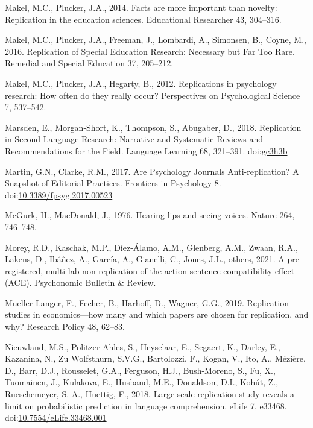 \documentclass[]{elsarticle} %
\newlength{\cslhangindent}
\newlength{\cslentryspacingunit} %
\newenvironment{CSLReferences}[2] %
 {%
  \setlength{\parindent}{0pt}
  \ifodd #1
  \let\oldpar\par
  \def\par{\hangindent=\cslhangindent\oldpar}
  \fi
  \setlength{\parskip}{#2\cslentryspacingunit}
 }%
 {}
\begin{document}
\begin{CSLReferences}{1}{0}
\leavevmode{}%
Makel, M.C., Plucker, J.A., 2014. Facts are more important than novelty: {Replication} in the education sciences. Educational Researcher 43, 304--316.

\leavevmode{}%
Makel, M.C., Plucker, J.A., Freeman, J., Lombardi, A., Simonsen, B., Coyne, M., 2016. Replication of {Special} {Education} {Research}: {Necessary} but {Far} {Too} {Rare}. Remedial and Special Education 37, 205--212.

\leavevmode{}%
Makel, M.C., Plucker, J.A., Hegarty, B., 2012. Replications in psychology research: {How} often do they really occur? Perspectives on Psychological Science 7, 537--542.

\leavevmode{}%
Marsden, E., Morgan‐Short, K., Thompson, S., Abugaber, D., 2018. Replication in {Second} {Language} {Research}: {Narrative} and {Systematic} {Reviews} and {Recommendations} for the {Field}. Language Learning 68, 321--391. doi:\href{https://doi.org/gc3h3b}{gc3h3b}

\leavevmode{}%
Martin, G.N., Clarke, R.M., 2017. Are {Psychology} {Journals} {Anti}-replication? {A} {Snapshot} of {Editorial} {Practices}. Frontiers in Psychology 8. doi:\href{https://doi.org/10.3389/fpsyg.2017.00523}{10.3389/fpsyg.2017.00523}

\leavevmode{}%
McGurk, H., MacDonald, J., 1976. Hearing lips and seeing voices. Nature 264, 746--748.

\leavevmode{}%
Morey, R.D., Kaschak, M.P., Díez-Álamo, A.M., Glenberg, A.M., Zwaan, R.A., Lakens, D., Ibáñez, A., García, A., Gianelli, C., Jones, J.L., others, 2021. A pre-registered, multi-lab non-replication of the action-sentence compatibility effect (ACE). Psychonomic Bulletin \& Review.

\leavevmode{}%
Mueller-Langer, F., Fecher, B., Harhoff, D., Wagner, G.G., 2019. Replication studies in economics---how many and which papers are chosen for replication, and why? Research Policy 48, 62--83.

\leavevmode{}%
Nieuwland, M.S., Politzer-Ahles, S., Heyselaar, E., Segaert, K., Darley, E., Kazanina, N., Zu Wolfsthurn, S.V.G., Bartolozzi, F., Kogan, V., Ito, A., Mézière, D., Barr, D.J., Rousselet, G.A., Ferguson, H.J., Bush-Moreno, S., Fu, X., Tuomainen, J., Kulakova, E., Husband, M.E., Donaldson, D.I., Kohút, Z., Rueschemeyer, S.-A., Huettig, F., 2018. Large-scale replication study reveals a limit on probabilistic prediction in language comprehension. eLife 7, e33468. doi:\href{https://doi.org/10.7554/eLife.33468.001}{10.7554/eLife.33468.001}


\end{CSLReferences}
\end{document}
